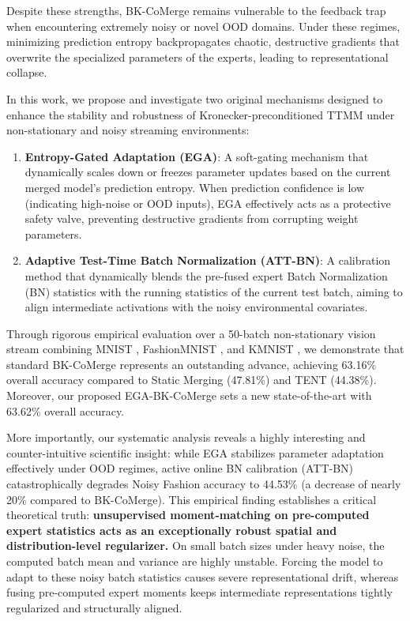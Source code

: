 \documentclass{article}
\theoremstyle{plain}
\theoremstyle{definition}
\theoremstyle{remark}
\begin{document}
Despite these strengths, BK-CoMerge remains vulnerable to the feedback trap when encountering extremely noisy or novel OOD domains. Under these regimes, minimizing prediction entropy backpropagates chaotic, destructive gradients that overwrite the specialized parameters of the experts, leading to representational collapse.

In this work, we propose and investigate two original mechanisms designed to enhance the stability and robustness of Kronecker-preconditioned TTMM under non-stationary and noisy streaming environments:
\begin{enumerate}
    \item \textbf{Entropy-Gated Adaptation (EGA)}: A soft-gating mechanism that dynamically scales down or freezes parameter updates based on the current merged model's prediction entropy. When prediction confidence is low (indicating high-noise or OOD inputs), EGA effectively acts as a protective safety valve, preventing destructive gradients from corrupting weight parameters.
    \item \textbf{Adaptive Test-Time Batch Normalization (ATT-BN)}: A calibration method that dynamically blends the pre-fused expert Batch Normalization (BN) statistics with the running statistics of the current test batch, aiming to align intermediate activations with the noisy environmental covariates.
\end{enumerate}

Through rigorous empirical evaluation over a 50-batch non-stationary vision stream combining MNIST \cite{leCun1998gradient}, FashionMNIST \cite{xiao2017fashion}, and KMNIST \cite{clanuwat2018deep}, we demonstrate that standard BK-CoMerge represents an outstanding advance, achieving 63.16\% overall accuracy compared to Static Merging (47.81\%) and TENT (44.38\%). Moreover, our proposed EGA-BK-CoMerge sets a new state-of-the-art with 63.62\% overall accuracy.

More importantly, our systematic analysis reveals a highly interesting and counter-intuitive scientific insight: while EGA stabilizes parameter adaptation effectively under OOD regimes, active online BN calibration (ATT-BN) catastrophically degrades Noisy Fashion accuracy to 44.53\% (a decrease of nearly 20\% compared to BK-CoMerge). This empirical finding establishes a critical theoretical truth: \textbf{unsupervised moment-matching on pre-computed expert statistics acts as an exceptionally robust spatial and distribution-level regularizer.} On small batch sizes under heavy noise, the computed batch mean and variance are highly unstable. Forcing the model to adapt to these noisy batch statistics causes severe representational drift, whereas fusing pre-computed expert moments keeps intermediate representations tightly regularized and structurally aligned.
\end{document}

